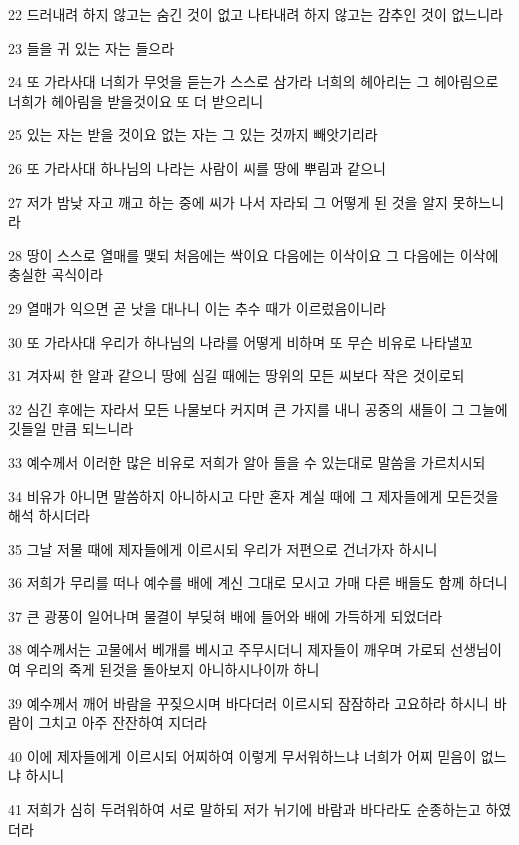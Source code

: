 \par 22 드러내려 하지 않고는 숨긴 것이 없고 나타내려 하지 않고는 감추인 것이 없느니라
\par 23 들을 귀 있는 자는 들으라
\par 24 또 가라사대 너희가 무엇을 듣는가 스스로 삼가라 너희의 헤아리는 그 헤아림으로 너희가 헤아림을 받을것이요 또 더 받으리니
\par 25 있는 자는 받을 것이요 없는 자는 그 있는 것까지 빼앗기리라
\par 26 또 가라사대 하나님의 나라는 사람이 씨를 땅에 뿌림과 같으니
\par 27 저가 밤낮 자고 깨고 하는 중에 씨가 나서 자라되 그 어떻게 된 것을 알지 못하느니라
\par 28 땅이 스스로 열매를 맺되 처음에는 싹이요 다음에는 이삭이요 그 다음에는 이삭에 충실한 곡식이라
\par 29 열매가 익으면 곧 낫을 대나니 이는 추수 때가 이르렀음이니라
\par 30 또 가라사대 우리가 하나님의 나라를 어떻게 비하며 또 무슨 비유로 나타낼꼬
\par 31 겨자씨 한 알과 같으니 땅에 심길 때에는 땅위의 모든 씨보다 작은 것이로되
\par 32 심긴 후에는 자라서 모든 나물보다 커지며 큰 가지를 내니 공중의 새들이 그 그늘에 깃들일 만큼 되느니라
\par 33 예수께서 이러한 많은 비유로 저희가 알아 들을 수 있는대로 말씀을 가르치시되
\par 34 비유가 아니면 말씀하지 아니하시고 다만 혼자 계실 때에 그 제자들에게 모든것을 해석 하시더라
\par 35 그날 저물 때에 제자들에게 이르시되 우리가 저편으로 건너가자 하시니
\par 36 저희가 무리를 떠나 예수를 배에 계신 그대로 모시고 가매 다른 배들도 함께 하더니
\par 37 큰 광풍이 일어나며 물결이 부딪혀 배에 들어와 배에 가득하게 되었더라
\par 38 예수께서는 고물에서 베개를 베시고 주무시더니 제자들이 깨우며 가로되 선생님이여 우리의 죽게 된것을 돌아보지 아니하시나이까 하니
\par 39 예수께서 깨어 바람을 꾸짖으시며 바다더러 이르시되 잠잠하라 고요하라 하시니 바람이 그치고 아주 잔잔하여 지더라
\par 40 이에 제자들에게 이르시되 어찌하여 이렇게 무서워하느냐 너희가 어찌 믿음이 없느냐 하시니
\par 41 저희가 심히 두려워하여 서로 말하되 저가 뉘기에 바람과 바다라도 순종하는고 하였더라

